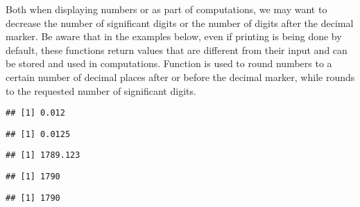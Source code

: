 \documentclass[krantz2]{krantz}\usepackage{knitr}
\begin{document}
Both when displaying numbers or as part of computations, we may want to decrease the number of significant digits or the number of digits after the decimal marker. Be aware that in the examples below, even if printing is being done by default, these functions return  values that are different from their input and can be stored and used in computations. Function  is used to round numbers to a certain number of decimal places after or before the decimal marker, while  rounds to the requested number of significant digits.

\begin{knitrout}\footnotesize
{}\color{fgcolor}\begin{kframe}
\begin{alltt}
\hlstd{(}\hlstd{,}  \hlstd{=} \hlstd{)}
\end{alltt}
\begin{verbatim}
## [1] 0.012
\end{verbatim}
\begin{alltt}
\hlstd{(}\hlstd{,}  \hlstd{=} \hlstd{)}
\end{alltt}
\begin{verbatim}
## [1] 0.0125
\end{verbatim}
\begin{alltt}
\hlstd{(}\hlstd{,}  \hlstd{=} \hlstd{)}
\end{alltt}
\begin{verbatim}
## [1] 1789.123
\end{verbatim}
\begin{alltt}
\hlstd{(}\hlstd{,}  \hlstd{=} \hlstd{)}
\end{alltt}
\begin{verbatim}
## [1] 1790
\end{verbatim}
\begin{alltt}
\hlstd{(}\hlstd{,}  \hlstd{=} \hlopt{-}\hlstd{)}
\end{alltt}
\begin{verbatim}
## [1] 1790
\end{verbatim}
\begin{alltt}
 \hlkwb{<-} 
 \hlkwb{<-}   \hlstd{=} \hlstd{)}

\end{alltt}
\end{kframe}
\end{knitrout}
\end{document}
